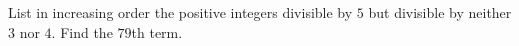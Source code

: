 List in increasing order the positive integers divisible by $5$ but divisible by neither $3$ nor $4$. Find the $79$th term.
